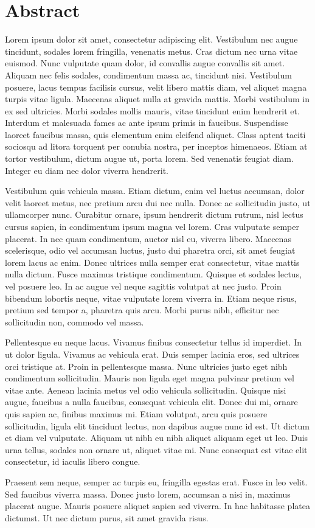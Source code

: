 \chapter*{Abstract}

Lorem ipsum dolor sit amet, consectetur adipiscing elit. Vestibulum nec augue tincidunt, sodales lorem fringilla, venenatis metus. Cras dictum nec urna vitae euismod. Nunc vulputate quam dolor, id convallis augue convallis sit amet. Aliquam nec felis sodales, condimentum massa ac, tincidunt nisi. Vestibulum posuere, lacus tempus facilisis cursus, velit libero mattis diam, vel aliquet magna turpis vitae ligula. Maecenas aliquet nulla at gravida mattis. Morbi vestibulum in ex sed ultricies. Morbi sodales mollis mauris, vitae tincidunt enim hendrerit et. Interdum et malesuada fames ac ante ipsum primis in faucibus. Suspendisse laoreet faucibus massa, quis elementum enim eleifend aliquet. Class aptent taciti sociosqu ad litora torquent per conubia nostra, per inceptos himenaeos. Etiam at tortor vestibulum, dictum augue ut, porta lorem. Sed venenatis feugiat diam. Integer eu diam nec dolor viverra hendrerit.

Vestibulum quis vehicula massa. Etiam dictum, enim vel luctus accumsan, dolor velit laoreet metus, nec pretium arcu dui nec nulla. Donec ac sollicitudin justo, ut ullamcorper nunc. Curabitur ornare, ipsum hendrerit dictum rutrum, nisl lectus cursus sapien, in condimentum ipsum magna vel lorem. Cras vulputate semper placerat. In nec quam condimentum, auctor nisl eu, viverra libero. Maecenas scelerisque, odio vel accumsan luctus, justo dui pharetra orci, sit amet feugiat lorem lacus ac enim. Donec ultrices nulla semper erat consectetur, vitae mattis nulla dictum. Fusce maximus tristique condimentum. Quisque et sodales lectus, vel posuere leo. In ac augue vel neque sagittis volutpat at nec justo. Proin bibendum lobortis neque, vitae vulputate lorem viverra in. Etiam neque risus, pretium sed tempor a, pharetra quis arcu. Morbi purus nibh, efficitur nec sollicitudin non, commodo vel massa.

Pellentesque eu neque lacus. Vivamus finibus consectetur tellus id imperdiet. In ut dolor ligula. Vivamus ac vehicula erat. Duis semper lacinia eros, sed ultrices orci tristique at. Proin in pellentesque massa. Nunc ultricies justo eget nibh condimentum sollicitudin. Mauris non ligula eget magna pulvinar pretium vel vitae ante. Aenean lacinia metus vel odio vehicula sollicitudin. Quisque nisi augue, faucibus a nulla faucibus, consequat vehicula elit. Donec dui mi, ornare quis sapien ac, finibus maximus mi. Etiam volutpat, arcu quis posuere sollicitudin, ligula elit tincidunt lectus, non dapibus augue nunc id est. Ut dictum et diam vel vulputate. Aliquam ut nibh eu nibh aliquet aliquam eget ut leo. Duis urna tellus, sodales non ornare ut, aliquet vitae mi. Nunc consequat est vitae elit consectetur, id iaculis libero congue.

Praesent sem neque, semper ac turpis eu, fringilla egestas erat. Fusce in leo velit. Sed faucibus viverra massa. Donec justo lorem, accumsan a nisi in, maximus placerat augue. Mauris posuere aliquet sapien sed viverra. In hac habitasse platea dictumst. Ut nec dictum purus, sit amet gravida risus.
